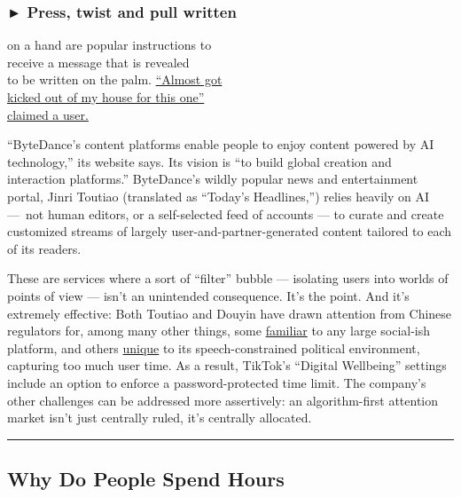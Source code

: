 \hypertarget{-press-twist-and-pull-written}{%
\subsubsection{► Press, twist and pull
written}\label{-press-twist-and-pull-written}}

on a hand are popular instructions to\\
receive a message that is revealed\\
to be written on the palm.
\href{https://www.tiktok.com/share/video/6665427333471554822}{``Almost
got}\\
\href{https://www.tiktok.com/share/video/6665427333471554822}{kicked out
of my house for this one''}\\
\href{https://www.tiktok.com/share/video/6665427333471554822}{claimed a
user.}

``ByteDance's content platforms enable people to enjoy content powered
by AI technology,'' its website says. Its vision is ``to build global
creation and interaction platforms.'' ByteDance's wildly popular news
and entertainment portal, Jinri Toutiao (translated as ``Today's
Headlines,'') relies heavily on AI ---~not human editors, or a
self-selected feed of accounts --- to curate and create customized
streams of largely user-and-partner-generated content tailored to each
of its readers.

These are services where a sort of ``filter'' bubble --- isolating users
into worlds of points of view --- isn't an unintended consequence. It's
the point. And it's extremely effective: Both Toutiao and Douyin have
drawn attention from Chinese regulators for, among many other things,
some
\href{https://www.newyorker.com/news/daily-comment/why-china-cracked-down-on-the-social-media-giant-bytedance}{familiar}
to any large social-ish platform, and others
\href{https://www.newyorker.com/news/daily-comment/why-china-cracked-down-on-the-social-media-giant-bytedance}{unique}
to its speech-constrained political environment, capturing too much user
time. As a result, TikTok's ``Digital Wellbeing'' settings include an
option to enforce a password-protected time limit. The company's other
challenges can be addressed more assertively: an algorithm-first
attention market isn't just centrally ruled, it's centrally allocated.

\begin{center}\rule{0.5\linewidth}{\linethickness}\end{center}

\hypertarget{why-do-people-spend-hours}{%
\subsection{Why Do People Spend Hours}\label{why-do-people-spend-hours}}

